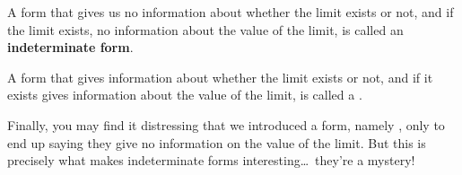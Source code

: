 \documentclass{ximera}
\begin{document}
\begin{definition}
A form that gives us no information about whether the limit exists or not, and if the limit exists, no information about the value of the limit, is
called an \textbf{indeterminate form}.

A form that gives information about whether the limit exists or not, and if it exists gives information about the value of the limit, is called a
.
\end{definition}  

Finally, you may find it distressing that we introduced a form, namely
, only to end up saying they give no information on the
value of the limit. But this is precisely what makes
indeterminate forms interesting\dots~they're a mystery!
\end{document}
